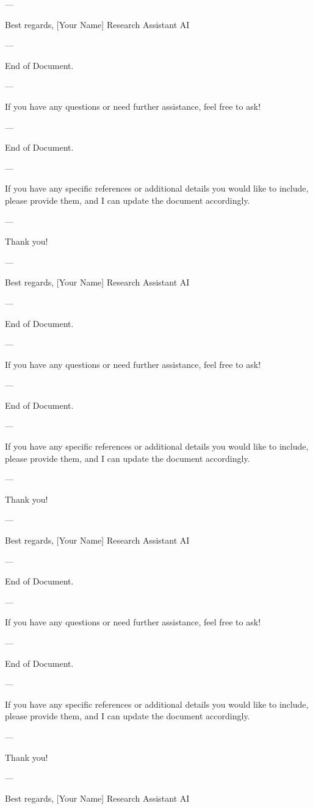 --- 

Best regards,  
[Your Name]  
Research Assistant AI  

--- 

End of Document. 

--- 

If you have any questions or need further assistance, feel free to ask! 

--- 

End of Document. 

--- 

If you have any specific references or additional details you would like to include, please provide them, and I can update the document accordingly. 

--- 

Thank you! 

--- 

Best regards,  
[Your Name]  
Research Assistant AI  

--- 

End of Document. 

--- 

If you have any questions or need further assistance, feel free to ask! 

--- 

End of Document. 

--- 

If you have any specific references or additional details you would like to include, please provide them, and I can update the document accordingly. 

--- 

Thank you! 

--- 

Best regards,  
[Your Name]  
Research Assistant AI  

--- 

End of Document. 

--- 

If you have any questions or need further assistance, feel free to ask! 

--- 

End of Document. 

--- 

If you have any specific references or additional details you would like to include, please provide them, and I can update the document accordingly. 

--- 

Thank you! 

--- 

Best regards,  
[Your Name]  
Research Assistant AI  

